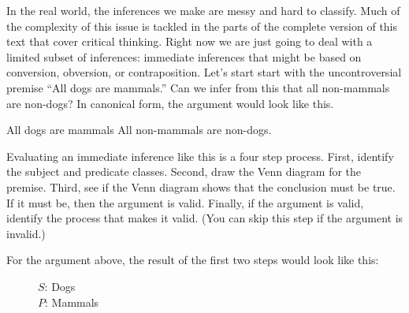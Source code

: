 In the real world, the inferences we make are messy and hard to classify. Much of the complexity of this issue is tackled in the parts of the complete version of this text that cover critical thinking. \label{ver_var}  Right now we are just going to deal with a limited subset of inferences: immediate inferences that might be based on conversion, obversion, or contraposition. Let's start start with the uncontroversial premise ``All dogs are mammals.'' Can we infer from this that all non-mammals are non-dogs? In canonical form, the argument would look like this. 

\pagebreak[4] %

\begin{earg*}
\item All dogs are mammals
\itemc[.3] All non-mammals are non-dogs.
\end{earg*} 

Evaluating an immediate inference like this is a four step process. First, identify the subject and predicate classes. Second, draw the Venn diagram for the premise. Third, see if the Venn diagram shows that the conclusion must be true. If it must be, then the argument is valid. Finally, if the argument is valid, identify the process that makes it valid. (You can skip this step if the argument is invalid.)

For the argument above, the result of the first two steps would look like this:   

\begin{figure}[H]
\begin{center}
\end{center}
\captionsetup{singlelinecheck=on}
\caption*{$S$: Dogs \\ $P$: Mammals}
\end{figure}

